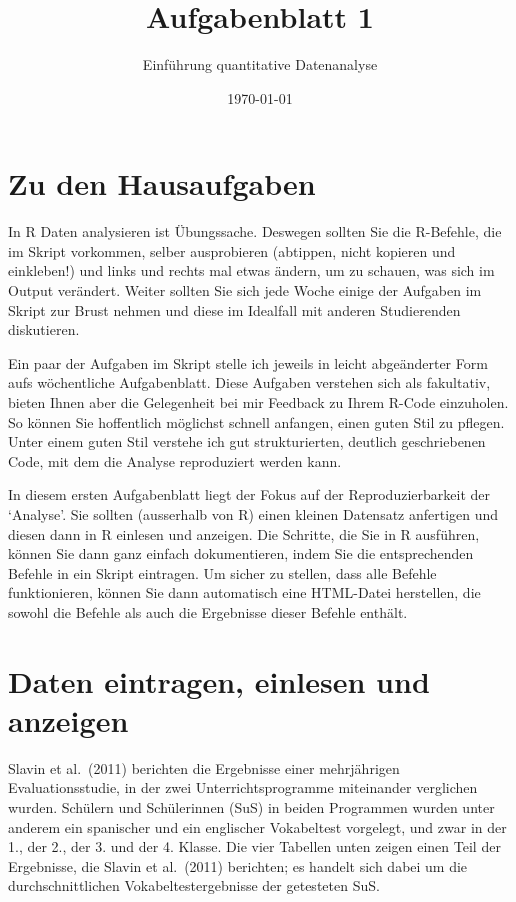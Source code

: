 \documentclass[10pt]{article}\usepackage[]{graphicx}\usepackage[]{xcolor}
\title{Aufgabenblatt 1}
\author{Einführung quantitative Datenanalyse}
\date{\today}
\begin{document}
\section*{Zu den Hausaufgaben}
In R Daten analysieren ist Übungssache.
Deswegen sollten Sie die R-Befehle, die im
Skript vorkommen, selber ausprobieren
(abtippen, nicht kopieren und einkleben!)
und links und rechts mal etwas ändern,
um zu schauen, was sich im Output verändert.
Weiter sollten Sie sich jede Woche einige
der Aufgaben im Skript zur Brust nehmen
und diese im Idealfall mit anderen Studierenden
diskutieren.

Ein paar der Aufgaben im Skript stelle ich
jeweils in leicht abgeänderter Form aufs
wöchentliche Aufgabenblatt. Diese Aufgaben
verstehen sich als fakultativ, bieten Ihnen
aber die Gelegenheit bei mir Feedback
zu Ihrem R-Code einzuholen. So können Sie
hoffentlich möglichst schnell anfangen,
einen guten Stil zu pflegen.
Unter einem guten Stil verstehe ich
gut strukturierten, deutlich geschriebenen
Code, mit dem die Analyse reproduziert werden kann.

In diesem ersten Aufgabenblatt liegt der Fokus
auf der Reproduzierbarkeit der `Analyse'.
Sie sollten (ausserhalb von R) einen kleinen
Datensatz anfertigen und diesen dann in R
einlesen und anzeigen. Die Schritte, die Sie
in R ausführen, können Sie dann ganz einfach
dokumentieren, indem Sie die entsprechenden Befehle
in ein Skript eintragen. Um sicher zu stellen,
dass alle Befehle funktionieren, können Sie dann 
automatisch eine HTML-Datei herstellen, die sowohl
die Befehle als auch die Ergebnisse dieser Befehle
enthält.

\section*{Daten eintragen, einlesen und anzeigen}
Slavin et al.\ (2011) berichten die Ergebnisse einer mehrjährigen Evaluationsstudie,
in der zwei Unterrichtsprogramme miteinander verglichen wurden.
Schülern und Schülerinnen (SuS) in beiden Programmen wurden unter anderem
ein spanischer und ein englischer Vokabeltest vorgelegt, und zwar
in der 1., der 2., der 3. und der 4. Klasse. Die vier Tabellen 
unten zeigen einen Teil der Ergebnisse, die Slavin et al.\ (2011) berichten; es handelt sich
dabei um die durchschnittlichen Vokabeltestergebnisse der getesteten SuS.
\end{document}
